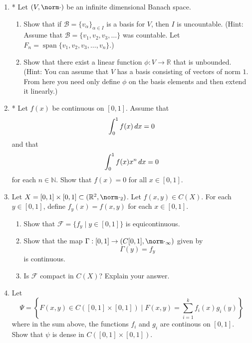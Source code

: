 \documentclass[notoc,notitlepage]{tufte-book}
\DeclareMathOperator{\Span}{span }
\begin{document}
\begin{enumerate}
  \item * Let $(V, \norm\cdot)$ be an infinite dimensional Banach space.
    \begin{enumerate}
      \item Show that if $\mathcal{B} = \{ v_\alpha \}_{\alpha \in I}$ is a basis for $V$, then $I$ is uncountable. (Hint: Assume that $\mathcal{B} = \{ v_1, v_2, v_3, \ldots \}$ was countable. Let $F_n = \Span \{ v_1, v_2, v_3, \ldots, v_n \}$.)
      \item Show that there exist a linear function $\phi : V \to \mathbb{R}$ that is unbounded. (Hint: You can assume that $V$ has a basis consisting of vectors of norm $1$. From here you need only define $\phi$ on the basis elements and then extend it linearly.)
    \end{enumerate}

  \item * Let $f(x)$ be continuous on $[0, 1]$. Assume that
    \begin{equation*}
      \int_{0}^{1} f(x) \mathop{}\!d{x} = 0
    \end{equation*}
    and that
    \begin{equation*}
      \int_{0}^{1} f(x) x^n \mathop{}\!d{x} = 0
    \end{equation*}
    for each $n \in \mathbb{N}$. Show that $f(x) = 0$ for all $x \in [0, 1]$.

  \item Let $X = [0, 1] \times [0, 1] \subset ( \mathbb{R}^2, \norm\cdot_2 )$. Let $f(x, y) \in C(X)$. For each $y \in [0, 1]$, define $f_y(x) = f(x, y)$ for each $x \in [0, 1]$.
    \begin{enumerate}
      \item Show that $\mathcal{F} = \{ f_y \mid y \in [0, 1] \}$ is equicontinuous.
      \item Show that the map $\Gamma : [0, 1] \to (C[0, 1], \norm\cdot_\infty)$ given by
        \begin{equation*}
          \Gamma(y) = f_y
        \end{equation*}
        is continuous.
      \item Is $\mathcal{F}$ compact in $C(X)$? Explain your answer.
    \end{enumerate}

  \item Let
    \begin{equation*}
      \Psi = \left\{ F(x, y) \in C([0, 1] \times [0, 1]) \mid F(x, y) = \sum_{i=1}^{k} f_i(x) g_i(y) \right\}
    \end{equation*}
    where in the sum above, the functions $f_i$ and $g_i$ are continous on $[0, 1]$. Show that $\psi$ is dense in $C([0, 1] \times [0, 1])$.


\end{enumerate}
\end{document}
